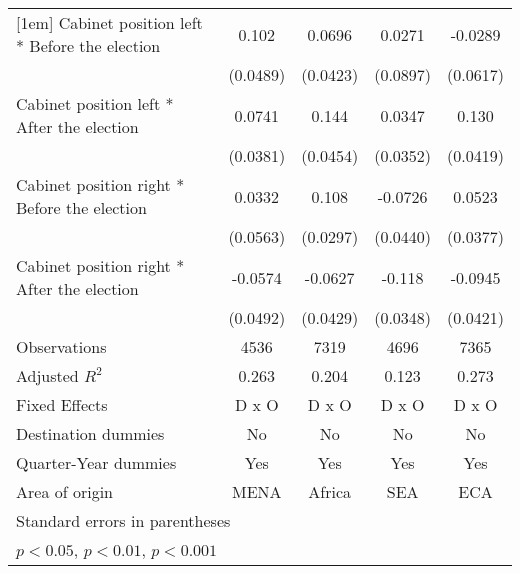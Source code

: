 \begin{table}[htbp]
\begin{tabular}{l*{4}{c}}
[1em]
Cabinet position left * Before the election&       0.102         &      0.0696         &      0.0271         &     -0.0289         \\
                    &    (0.0489)         &    (0.0423)         &    (0.0897)         &    (0.0617)         \\
[1em]
Cabinet position left * After the election&      0.0741         &       0.144\sym{**} &      0.0347         &       0.130\sym{**} \\
                    &    (0.0381)         &    (0.0454)         &    (0.0352)         &    (0.0419)         \\
[1em]
Cabinet position right * Before the election&      0.0332         &       0.108\sym{**} &     -0.0726         &      0.0523         \\
                    &    (0.0563)         &    (0.0297)         &    (0.0440)         &    (0.0377)         \\
[1em]
Cabinet position right * After the election&     -0.0574         &     -0.0627         &      -0.118\sym{**} &     -0.0945\sym{*}  \\
                    &    (0.0492)         &    (0.0429)         &    (0.0348)         &    (0.0421)         \\
\hline
Observations        &        4536         &        7319         &        4696         &        7365         \\
Adjusted \(R^{2}\)  &       0.263         &       0.204         &       0.123         &       0.273         \\
Fixed Effects       &       D x O         &       D x O         &       D x O         &       D x O         \\
Destination dummies &          No         &          No         &          No         &          No         \\
Quarter-Year dummies&         Yes         &         Yes         &         Yes         &         Yes         \\
Area of origin      &        MENA         &      Africa         &         SEA         &         ECA         \\
\hline\hline
\multicolumn{5}{l}{\footnotesize Standard errors in parentheses}\\
\multicolumn{5}{l}{\footnotesize \sym{*} \(p<0.05\), \sym{**} \(p<0.01\), \sym{***} \(p<0.001\)}\\
\end{tabular}
\end{table}

